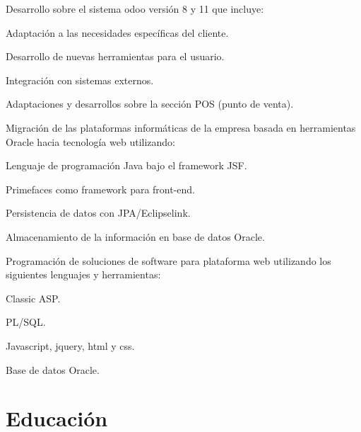 \documentclass[letterpaper]{twentysecondcv} %
\begin{document}
\begin{twenty} %
	{
		Desarrollo sobre el sistema odoo versión 8 y 11 que incluye:
		\begin{compactitem}[\color{blue}$\circ$]
			\item Adaptación a las necesidades específicas del cliente.
			\item Desarrollo de nuevas herramientas para el usuario.
			\item Integración con sistemas externos.
			\item Adaptaciones y desarrollos sobre la sección POS (punto de venta).
		\end{compactitem}
	}
	{
		Migración de las plataformas informáticas de la empresa basada en herramientas
		Oracle hacia tecnología web utilizando:
		\begin{compactitem}[\color{blue}$\circ$]
			\item Lenguaje de programación Java bajo el framework JSF.
			\item Primefaces como framework para front-end.
			\item Persistencia de datos con JPA/Eclipselink.
			\item Almacenamiento de la información en base de datos Oracle.
		\end{compactitem}
	}
	{
		Programación de soluciones de software para plataforma web utilizando los
		siguientes lenguajes y herramientas:
		\begin{compactitem}[\color{blue}$\circ$]
			\item Classic ASP. 
			\item PL/SQL.
			\item Javascript, jquery, html y css.
			\item Base de datos Oracle.
		\end{compactitem}
	}
\end{twenty}




\section{Educación}
\end{document}
